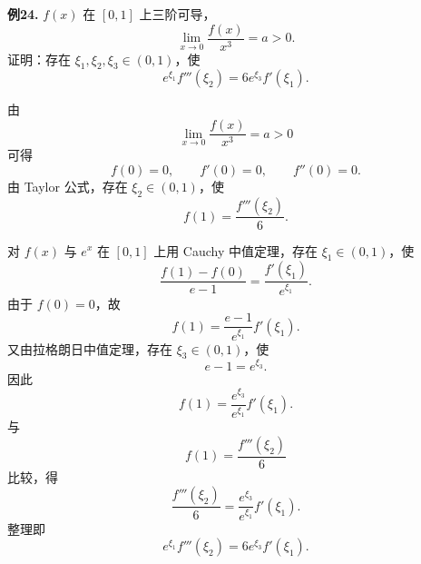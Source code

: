 \begin{problemblock}
\textbf{例24.} \(f(x)\) 在 \([0,1]\) 上三阶可导，
\[
\lim_{x\to0}\frac{f(x)}{x^3}=a>0.
\]
证明：存在 \(\xi_1,\xi_2,\xi_3\in(0,1)\)，使
\[
e^{\xi_1}f'''(\xi_2)=6e^{\xi_3}f'(\xi_1).
\]
\end{problemblock}
\begin{solutionblock}
由
\[
\lim_{x\to0}\frac{f(x)}{x^3}=a>0
\]
可得
\[
f(0)=0,\qquad f'(0)=0,\qquad f''(0)=0.
\]
由 Taylor 公式，存在 \(\xi_2\in(0,1)\)，使
\[
f(1)=\frac{f'''(\xi_2)}{6}.
\]

对 \(f(x)\) 与 \(e^x\) 在 \([0,1]\) 上用 Cauchy 中值定理，存在 \(\xi_1\in(0,1)\)，使
\[
\frac{f(1)-f(0)}{e-1}
=\frac{f'(\xi_1)}{e^{\xi_1}}.
\]
由于 \(f(0)=0\)，故
\[
f(1)=\frac{e-1}{e^{\xi_1}}f'(\xi_1).
\]
又由拉格朗日中值定理，存在 \(\xi_3\in(0,1)\)，使
\[
e-1=e^{\xi_3}.
\]
因此
\[
f(1)=\frac{e^{\xi_3}}{e^{\xi_1}}f'(\xi_1).
\]
与
\[
f(1)=\frac{f'''(\xi_2)}6
\]
比较，得
\[
\frac{f'''(\xi_2)}6
=\frac{e^{\xi_3}}{e^{\xi_1}}f'(\xi_1).
\]
整理即
\[
e^{\xi_1}f'''(\xi_2)=6e^{\xi_3}f'(\xi_1).
\]
\end{solutionblock}

